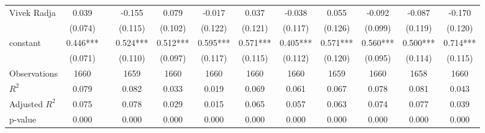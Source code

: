 \begin{table}[htbp]
\begin{tabular}{lcrccccccccc}
    Vivek Radja & 0.039 &   & -0.155 & 0.079 & -0.017 & 0.037 & -0.038 & 0.055 & -0.092 & -0.087 & -0.170 \\
      & (0.074) &   & (0.115) & (0.102) & (0.122) & (0.121) & (0.117) & (0.126) & (0.099) & (0.119) & (0.120) \\
    constant & 0.446*** &   & 0.524*** & 0.512*** & 0.595*** & 0.571*** & 0.405*** & 0.571*** & 0.560*** & 0.500*** & 0.714*** \\
      & (0.071) &   & (0.110) & (0.097) & (0.117) & (0.115) & (0.112) & (0.120) & (0.095) & (0.114) & (0.115) \\
    \midrule
    Observations & 1660 &   & 1659 & 1660 & 1660 & 1660 & 1660 & 1659 & 1660 & 1658 & 1660 \\
    $R^2$ & 0.079 &   & 0.082 & 0.033 & 0.019 & 0.069 & 0.061 & 0.067 & 0.078 & 0.081 & 0.043 \\
    Adjusted $R^2$ & 0.075 &   & 0.078 & 0.029 & 0.015 & 0.065 & 0.057 & 0.063 & 0.074 & 0.077 & 0.039 \\
    p-value & 0.000 &   & 0.000 & 0.000 & 0.000 & 0.000 & 0.000 & 0.000 & 0.000 & 0.000 & 0.000 \\
    \bottomrule
    \end{tabular}%
\end{table}%
